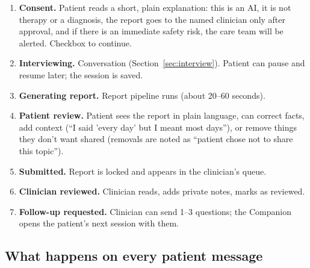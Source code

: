 \documentclass[11pt]{article}
\begin{document}
\begin{enumerate}
  \item \textbf{Consent.} Patient reads a short, plain explanation: this is an AI, it is not therapy or a diagnosis, the report goes to
        the named clinician only after approval, and if there is an immediate safety risk, the care team will be alerted. Checkbox to continue.
  \item \textbf{Interviewing.} Conversation (Section~\ref{sec:interview}). Patient can pause and resume later; the session is saved.
  \item \textbf{Generating report.} Report pipeline runs (about 20--60 seconds).
  \item \textbf{Patient review.} Patient sees the report in plain language, can correct facts, add context (``I said 'every day' but I meant most days''),
        or remove things they don't want shared (removals are noted as ``patient chose not to share this topic'').
  \item \textbf{Submitted.} Report is locked and appears in the clinician's queue.
  \item \textbf{Clinician reviewed.} Clinician reads, adds private notes, marks as reviewed.
  \item \textbf{Follow-up requested.} Clinician can send 1--3 questions; the Companion opens the patient's next session with them.
\end{enumerate}

\subsection{What happens on every patient message}
\label{sec:turn}
\end{document}
